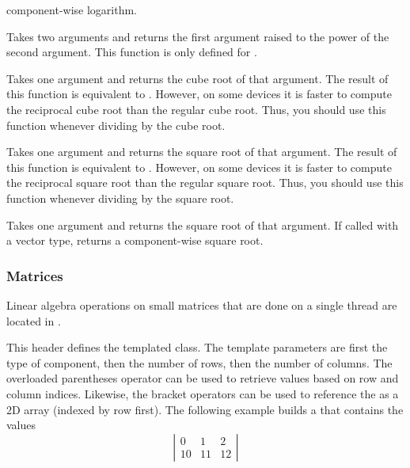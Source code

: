 \begin{description}
  component-wise logarithm.
\item[\daxmath{Pow}]  Takes two arguments and returns the
  first argument raised to the power of the second argument. This function
  is only defined for .
\item[\daxmath{RCbrt}]  Takes one argument and
  returns the cube root of that argument. The result of this function is
  equivalent to . However, on some devices it is faster
  to compute the reciprocal cube root than the regular cube root. Thus, you
  should use this function whenever dividing by the cube root.
\item[\daxmath{RSqrt}]  Takes one argument
  and returns the square root of that argument. The result of this function
  is equivalent to . However, on some devices it is
  faster to compute the reciprocal square root than the regular square
  root. Thus, you should use this function whenever dividing by the square
  root.
\item[\daxmath{Sqrt}]  Takes one argument and returns
  the square root of that argument. If called with a vector type, returns a
  component-wise square root.
\end{description}

\subsubsection{Matrices}

Linear algebra operations on small matrices that are done on a single
thread are located in .

This header defines the  templated class. The template
parameters are first the type of component, then the number of rows, then
the number of columns. The overloaded parentheses operator can be used to
retrieve values based on row and column indices. Likewise, the bracket
operators can be used to reference the  as a 2D
array (indexed by row first). The following example builds a
 that contains the values
\begin{equation*}
  \left|
  \begin{array}{ccc}
    0 & 1 & 2 \\
    10 & 11 & 12
  \end{array}
  \right|
\end{equation*}

